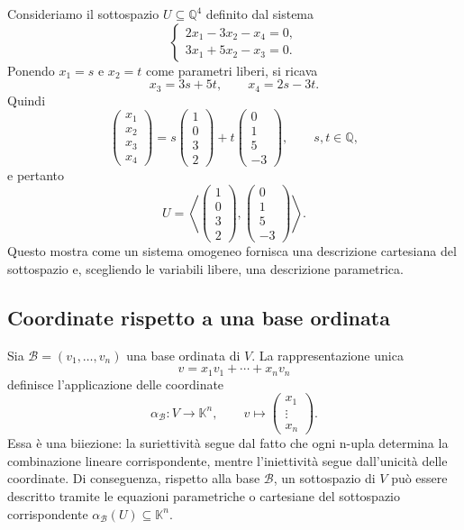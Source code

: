 \documentclass[11pt,a4paper]{article}
\newcommand{\KK}{\mathbb{K}}
\theoremstyle{plain}
\theoremstyle{definition}
\theoremstyle{remark}
\begin{document}
Consideriamo il sottospazio $U\subseteq\mathbb{Q}^4$ definito dal sistema
\[
 \begin{cases}
  2x_1-3x_2-x_4=0,\\
  3x_1+5x_2-x_3=0.
 \end{cases}
\]
Ponendo $x_1=s$ e $x_2=t$ come parametri liberi, si ricava
\[
 x_3=3s+5t,\qquad x_4=2s-3t.
\]
Quindi
\[
 \begin{pmatrix}x_1\\x_2\\x_3\\x_4\end{pmatrix}
 =s\begin{pmatrix}1\\0\\3\\2\end{pmatrix}
 +t\begin{pmatrix}0\\1\\5\\-3\end{pmatrix},
 \qquad s,t\in\mathbb{Q},
\]
e pertanto
\[
 U=\left\langle
 \begin{pmatrix}1\\0\\3\\2\end{pmatrix},
 \begin{pmatrix}0\\1\\5\\-3\end{pmatrix}
 \right\rangle.
\]
Questo mostra come un sistema omogeneo fornisca una descrizione cartesiana del sottospazio e, scegliendo le variabili libere, una descrizione parametrica.

\subsection{Coordinate rispetto a una base ordinata}

Sia $\mathcal B=(v_1,\ldots,v_n)$ una base ordinata di $V$. La rappresentazione unica
\[
 v=x_1v_1+\cdots+x_nv_n
\]
definisce l'applicazione delle coordinate
\[
 \alpha_{\mathcal B}:V\longrightarrow\KK^n,
 \qquad v\longmapsto\begin{pmatrix}x_1\\\vdots\\x_n\end{pmatrix}.
\]
Essa è una biiezione: la suriettività segue dal fatto che ogni n-upla determina la combinazione lineare corrispondente, mentre l'iniettività segue dall'unicità delle coordinate. Di conseguenza, rispetto alla base $\mathcal B$, un sottospazio di $V$ può essere descritto tramite le equazioni parametriche o cartesiane del sottospazio corrispondente $\alpha_{\mathcal B}(U)\subseteq\KK^n$.
\end{document}
